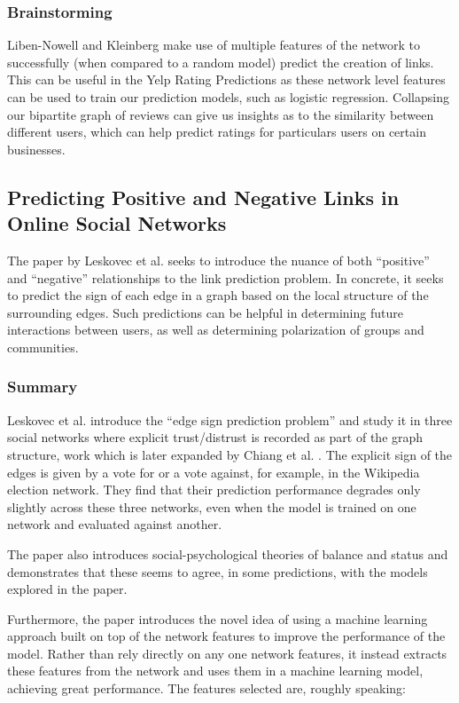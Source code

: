 \documentclass[letterpaper, 11 pt, conference]{ieeeconf}  %
\begin{document}
\subsubsection{Brainstorming}
Liben-Nowell and Kleinberg make use of multiple features of the network to successfully (when compared to a random model) predict the creation of links. This can be useful in the Yelp Rating Predictions as these network level features can be used to train our prediction models, such as logistic regression. Collapsing our bipartite graph of reviews can give us insights as to the similarity between different users, which can help predict ratings for particulars users on certain businesses.

\subsection{Predicting Positive and Negative Links in Online Social Networks}

The paper by Leskovec et al. \cite{Leskovec:2010:PPN:1772690.1772756} seeks to introduce the nuance of both ``positive'' and ``negative'' relationships to the link prediction problem. In concrete, it seeks to predict the sign of each edge in a graph based on the local structure of the surrounding edges. Such predictions can be helpful in determining future interactions between users, as well as determining polarization of groups and communities. 

\subsubsection{Summary}
Leskovec et al. introduce the ``edge sign prediction problem'' and study it in three social networks where explicit trust/distrust is recorded as part of the graph structure, work which is later expanded by Chiang et al. \cite{Chiang:2011:ELC:2063576.2063742}. The explicit sign of the edges is given by a vote for or a vote against, for example, in the Wikipedia election network. They find that their prediction performance degrades only slightly across these three networks, even when the model is trained on one network and evaluated against another.

The paper also introduces social-psychological theories of balance and status and demonstrates that these seems to agree, in some predictions, with the models explored in the paper.

Furthermore, the paper introduces the novel idea of using a machine learning approach built on top of the network features to improve the performance of the model. Rather than rely directly on any one network features, it instead extracts these features from the network and uses them in a machine learning model, achieving great performance. The features selected are, roughly speaking:
\end{document}
